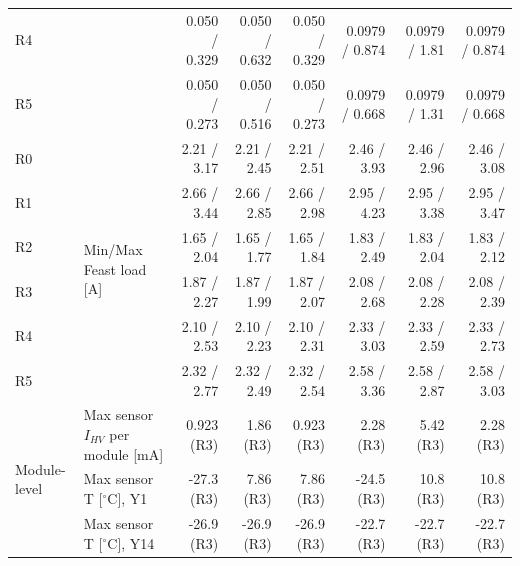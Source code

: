 \begin{table}[ht]
\begin{centering}
{\begin{tabular}{|l|l|r|r|r|r|r|r|}
R4                              &                                                                       & 0.050 / 0.329 & 0.050 / 0.632 & 0.050 / 0.329 & 0.0979 / 0.874 & 0.0979 / 1.81 & 0.0979 / 0.874 \\ 
R5                              &                                                                       & 0.050 / 0.273 & 0.050 / 0.516 & 0.050 / 0.273 & 0.0979 / 0.668 & 0.0979 / 1.31 & 0.0979 / 0.668 \\ \hline
R0                              & \multirow{6}{*}{Min/Max Feast load [A]}                               &   2.21 / 3.17 &   2.21 / 2.45 &   2.21 / 2.51 &    2.46 / 3.93 &   2.46 / 2.96 &    2.46 / 3.08 \\ 
R1                              &                                                                       &   2.66 / 3.44 &   2.66 / 2.85 &   2.66 / 2.98 &    2.95 / 4.23 &   2.95 / 3.38 &    2.95 / 3.47 \\ 
R2                              &                                                                       &   1.65 / 2.04 &   1.65 / 1.77 &   1.65 / 1.84 &    1.83 / 2.49 &   1.83 / 2.04 &    1.83 / 2.12 \\ 
R3                              &                                                                       &   1.87 / 2.27 &   1.87 / 1.99 &   1.87 / 2.07 &    2.08 / 2.68 &   2.08 / 2.28 &    2.08 / 2.39 \\ 
R4                              &                                                                       &   2.10 / 2.53 &   2.10 / 2.23 &   2.10 / 2.31 &    2.33 / 3.03 &   2.33 / 2.59 &    2.33 / 2.73 \\ 
R5                              &                                                                       &   2.32 / 2.77 &   2.32 / 2.49 &   2.32 / 2.54 &    2.58 / 3.36 &   2.58 / 2.87 &    2.58 / 3.03 \\ \hline
\multirow{6}{*}{Module-level}   & Max sensor $I_{HV}$ per module [mA]                                   &    0.923 (R3) &     1.86 (R3) &    0.923 (R3) &      2.28 (R3) &     5.42 (R3) &      2.28 (R3) \\ 
\multirow{6}{*}{Components}     & Max sensor T [$^\circ$C], Y1                                          &    -27.3 (R3) &     7.86 (R3) &     7.86 (R3) &     -24.5 (R3) &     10.8 (R3) &      10.8 (R3) \\ 
                                & Max sensor T [$^\circ$C], Y14                                         &    -26.9 (R3) &    -26.9 (R3) &    -26.9 (R3) &     -22.7 (R3) &    -22.7 (R3) &     -22.7 (R3) \\ 

\end{tabular}}
\end{centering}
\end{table}
